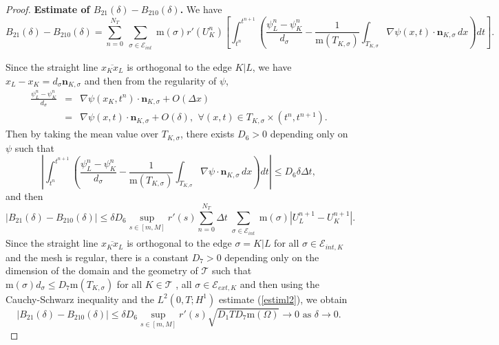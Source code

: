 \documentclass[smallextended]{svjour3}
\begin{document}
\begin{proof}
\textbf{Estimate of $B_{21}(\delta)-B_{210}(\delta)$.} We have
\begin{equation*}
B_{21}(\delta)-B_{210}(\delta)=\sum_{n=0}^{N_{T}}\sum_{\substack{\sigma \in \mathcal{E}_{int}}} \!\!\!\! \text{m}(\sigma)r'(U^{n}_{K})\left[\int_{t^{n}}^{t^{n+1}}\!\!\!\! \left(\frac{\psi_{L}^{n}-\psi_{K}^{n}}{d_{\sigma}}-\frac{1}{\text{m}(T_{K,\sigma})}\int_{T_{K,\sigma}}\!\!\!\!\!\!\!\! \nabla\psi(x,t)\cdot \textbf{n}_{K,\sigma}\, dx\right)dt\right]\!\!.
\end{equation*}

Since the straight line $\overline{x_{K}x_{L}}$ is orthogonal to the edge $K|L$, we have $x_{L}-x_{K}=d_{\sigma}\mathbf{n}_{K,\sigma}$ and then from the regularity of $\psi$,
\begin{eqnarray*}
\frac{\psi_{L}^{n}-\psi_{K}^{n}}{d_{\sigma}}&=&\nabla \psi(x_{K},t^{n}) \cdot \mathbf{n}_{K,\sigma}+O(\Delta x)\\
&=& \nabla \psi(x,t) \cdot \mathbf{n}_{K,\sigma}+O(\delta), \,\ \forall (x,t) \in T_{K,\sigma} \times \left(t^{n},t^{n+1}\right).
\end{eqnarray*}
Then by taking the mean value over $T_{K,\sigma}$, there exists $D_{6}>0$ depending only on $\psi$ such that 
\begin{equation*}
\left\vert \int_{t^{n}}^{t^{n+1}}\left(\frac{\psi_{L}^{n}-\psi_{K}^{n}}{d_{\sigma}}-\frac{1}{\text{m}(T_{K,\sigma})}\int_{T_{K,\sigma}}\nabla \psi \cdot \mathbf{n}_{K,\sigma} \, dx \right)dt \right\vert \leq D_{6} \delta \Delta t,
\end{equation*}
and then 
\begin{equation*}
\left|B_{21}(\delta)-B_{210}(\delta)\right| \leq \delta D_{6} \sup_{s \in [m,M]}r'(s)\sum_{n=0}^{N_{T}}\Delta t\sum_{\substack{\sigma \in \mathcal{E}_{int}}}\text{m}(\sigma)\left|U_{L}^{n+1}-U_{K}^{n+1}\right|.
\end{equation*}
Since the straight line $\overline{x_{K}x_{L}}$ is orthogonal to the edge $\sigma=K|L$ for all $\sigma \in \mathcal{E}_{int,K}$ and the mesh is regular, there is a constant $D_{7}>0$ depending only on the dimension of the domain and the geometry of $\mathcal{T}$ such that  $\text{m}(\sigma)d_{\sigma} \leq D_{7} \text{m}(T_{K,\sigma})$ for all $K \in \mathcal{T}$ , all $\sigma \in \mathcal{E}_{ext,K}$ and then using the Cauchy-Schwarz inequality and the $L^{2}(0,T;H^{1})$ estimate (\ref{estiml2}), we obtain
\begin{equation*}
\left|B_{21}(\delta)-B_{210}(\delta)\right| \leq \delta D_{6} \sup_{s \in [m,M]}r'(s)\sqrt{D_{1}TD_{7}\text{m}(\Omega)} \longrightarrow 0 \text{ as } \delta \rightarrow 0.
\end{equation*}


\end{proof}
\end{document}
